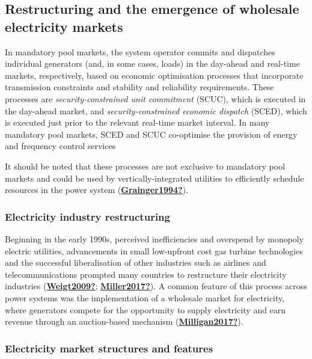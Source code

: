 \documentclass[12pt,a4paper,]{report}
\begin{document}
\hypertarget{restructuring-and-the-emergence-of-wholesale-electricity-markets}{%
\subsection{Restructuring and the emergence of wholesale electricity
markets}\label{restructuring-and-the-emergence-of-wholesale-electricity-markets}}

In mandatory pool markets, the system operator commits and dispatches
individual generators (and, in some cases, loads) in the day-ahead and
real-time markets, respectively, based on economic optimisation
processes that incorporate transmission constraints and stability and
reliability requirements. These processes are \emph{security-constrained
unit commitment} (SCUC), which is executed in the day-ahead market, and
\emph{security-constrained economic dispatch} (SCED), which is executed
just prior to the relevant real-time market interval. In many mandatory
pool markets, SCED and SCUC co-optimise the provision of energy and
frequency control services

It should be noted that these processes are not exclusive to mandatory
pool markets and could be used by vertically-integrated utilities to
efficiently schedule resources in the power system
(\protect\hyperlink{ref-Grainger1994}{\textbf{Grainger1994?}}).

\hypertarget{electricity-industry-restructuring}{%
\subsubsection{Electricity industry
restructuring}\label{electricity-industry-restructuring}}

Beginning in the early 1990s, perceived inefficiencies and overspend by
monopoly electric utilities, advancements in small low-upfront cost gas
turbine technologies and the successful liberalisation of other
industries such as airlines and telecommunications prompted many
countries to restructure their electricity industries
(\protect\hyperlink{ref-Weigt2009}{\textbf{Weigt2009?}};
\protect\hyperlink{ref-Miller2017}{\textbf{Miller2017?}}). A common
feature of this process across power systems was the implementation of a
wholesale market for electricity, where generators compete for the
opportunity to supply electricity and earn revenue through an
auction-based mechanism
(\protect\hyperlink{ref-Milligan2017}{\textbf{Milligan2017?}}).

\hypertarget{electricity-market-structures-and-features}{%
\subsubsection{Electricity market structures and
features}\label{electricity-market-structures-and-features}}
\end{document}
